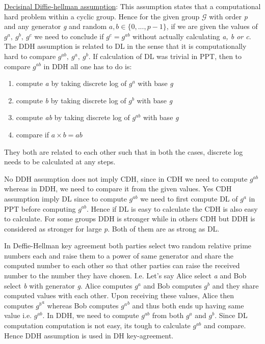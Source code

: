 \documentclass{article}
\begin{document}
        \underline{Decisinal Diffie-hellman assumption}: This assumption states that a computational hard problem within a cyclic group. Hence for the given group $\mathcal{G}$ with order \emph{p} and any generator \emph{g} and random $a, b \in \{0, ... , p-1\}$, if we are given the values of $g^a,\ g^b,\ g^c$ we need to conclude if $g^c = g^{ab}$ without actually calculating \emph{a, b or c}.\newline
        The DDH assumption is related to DL in the sense that it is computationally hard to compare $g^{ab},\ g^a,\ g^b$. If calculation of DL was trivial in PPT, then to compare $g^{ab}$ in DDH all one has to do is:\newline
        \begin{enumerate}
            \item compute \emph{a} by taking discrete log of $g^a$ with base \emph{g}
            \item compute \emph{b} by taking discrete log of $g^b$ with base \emph{g}
            \item compute \emph{ab} by taking discrete log of $g^{ab}$ with base \emph{g}
            \item compare if $a \times{b} = ab$
        \end{enumerate}
        
        They both are related to each other such that in both the cases, discrete log needs to be calculated at any steps.\newline
        
        No DDH assumption does not imply CDH, since in CDH we need to compute $g^{ab}$ whereas in DDH, we need to compare it from the given values. Yes CDH assumption imply DL since to compute $g^{ab}$ we need to first compute DL of $g^a$ in PPT before computing $g^{ab}$. Hence if DL is easy to calculate the CDH is also easy to calculate.\newline
        For some groups DDH is stronger while in others CDH but DDH is considered as stronger for large \emph{p}. Both of them are as strong as DL. \newline
        
        In Deffie-Hellman key agreement both parties select two random relative prime numbers each and raise them to a power of same generator and share the computed number to each other so that other parties can raise the received number to the number they have chosen. I.e. Let's say Alice select \emph{a} and Bob select \emph{b} with generator \emph{g}. Alice computes $g^a$ and Bob computes $g^b$ and they share computed values with each other. Upon receiving these values, Alice then computes ${g^b}^a$ whereas Bob computes ${g^a}^b$ and thus both ends up having same value i.e. $g^{ab}$. In DDH, we need to compute $g^{ab}$ from both $g^{a}$ and $g^{b}$. Since DL computation computation is not easy, its tough to calculate $g^{ab}$ and compare. Hence DDH assumption is used in DH key-agreement.
        
\end{document}
